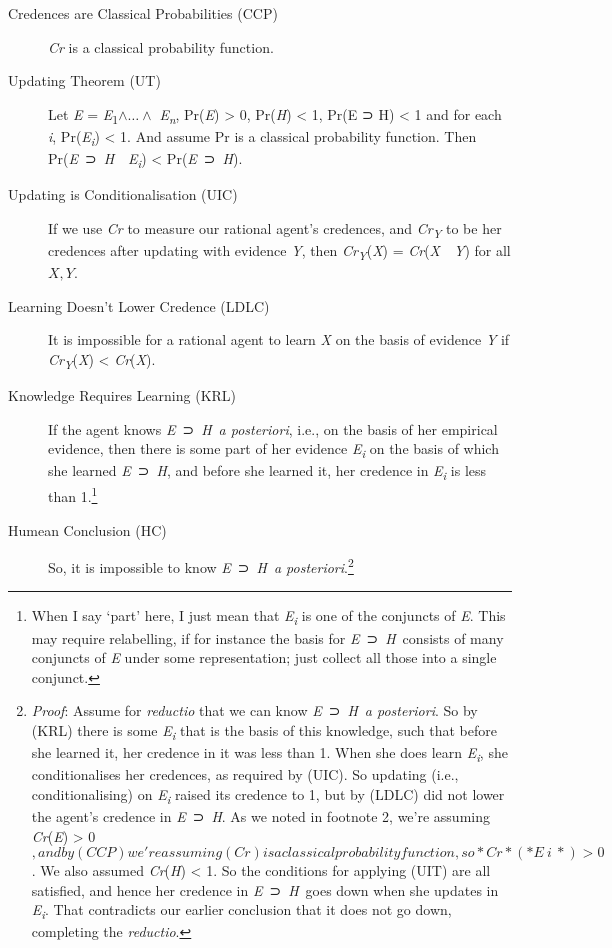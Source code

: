\documentclass[
  10pt,
  letterpaper,
  DIV=11,
  numbers=noendperiod,
  twoside]{scrartcl}
\begin{document}
\begin{description}
\item[Credences are Classical Probabilities (CCP)]
\emph{Cr} is a classical probability function.
\item[Updating Theorem (UT)]
Let \emph{E} = \emph{E}\textsubscript{1}\(\wedge \dots \wedge\)
\emph{E\textsubscript{n}}, Pr(\emph{E}) \textgreater{} 0, Pr(\emph{H})
\textless{} 1, Pr(E ⊃ H) \textless{} 1 and for each \emph{i},
Pr(\emph{E\textsubscript{i}}) \textless{} 1. And assume Pr is a
classical probability function. Then
Pr(\emph{E}~⊃~\emph{H}~\textbar~\emph{E\textsubscript{i}}) \textless{}
Pr(\emph{E}~⊃~\emph{H}).
\item[Updating is Conditionalisation (UIC)]
If we use \emph{Cr} to measure our rational agent's credences, and
\emph{Cr\textsubscript{Y}} to be her credences after updating with
evidence \emph{Y}, then \emph{Cr\textsubscript{Y}}(\emph{X}) =
\emph{Cr}(\emph{X}~\textbar~\emph{Y}) for all \(X, Y\).
\item[Learning Doesn't Lower Credence (LDLC)]
It is impossible for a rational agent to learn \emph{X} on the basis of
evidence \emph{Y} if \emph{Cr\textsubscript{Y}}(\emph{X}) \textless{}
\emph{Cr}(\emph{X}).
\item[Knowledge Requires Learning (KRL)]
If the agent knows \emph{E}~⊃~\emph{H}~\emph{a posteriori}, i.e., on the
basis of her empirical evidence, then there is some part of her evidence
\emph{E\textsubscript{i}} on the basis of which she learned
\emph{E}~⊃~\emph{H}, and before she learned it, her credence in
\emph{E\textsubscript{i}} is less than 1.\footnote{When I say `part'
  here, I just mean that \emph{E\textsubscript{i}} is one of the
  conjuncts of \emph{E}. This may require relabelling, if for instance
  the basis for \emph{E}~⊃~\emph{H}~consists of many conjuncts of
  \emph{E} under some representation; just collect all those into a
  single conjunct.}
\item[Humean Conclusion (HC)]
So, it is impossible to know \emph{E}~⊃~\emph{H}~\emph{a
posteriori}.\footnote{\emph{Proof}: Assume for \emph{reductio} that we
  can know \emph{E}~⊃~\emph{H}~\emph{a posteriori}. So by (KRL) there is
  some \emph{E\textsubscript{i}} that is the basis of this knowledge,
  such that before she learned it, her credence in it was less than 1.
  When she does learn \emph{E\textsubscript{i}}, she conditionalises her
  credences, as required by (UIC). So updating (i.e., conditionalising)
  on \emph{E\textsubscript{i}} raised its credence to 1, but by (LDLC)
  did not lower the agent's credence in \emph{E}~⊃~\emph{H}. As we noted
  in footnote 2, we're assuming \emph{Cr}(\emph{E}) \textgreater{}
  0\(, and by (CCP) we're assuming (Cr) is a classical probability function, so *Cr*(*E~i~*) > 0\).
  We also assumed \emph{Cr}(\emph{H}) \textless{} 1. So the conditions
  for applying (UIT) are all satisfied, and hence her credence in
  \emph{E}~⊃~\emph{H}~goes down when she updates in
  \emph{E\textsubscript{i}}. That contradicts our earlier conclusion
  that it does not go down, completing the \emph{reductio}.}
\end{description}
\end{document}

